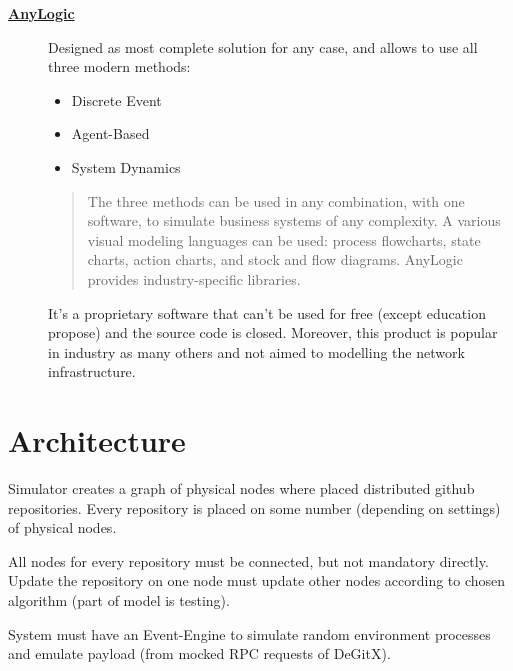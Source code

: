 \documentclass[12pt,oneside]{article}
\begin{document}
\begin{description}
  \item[\href{https://www.anylogic.com/}{\textbf{AnyLogic}}]
Designed as most complete solution for any case, and allows to use all three modern methods:
    \begin{itemize}
        \item Discrete Event
        \item Agent-Based
        \item System Dynamics
    \end{itemize}
    \begin{quote}
    The three methods can be used in any combination, with one software, to simulate business systems of any complexity. A various visual modeling languages can be used: process flowcharts, state charts, action charts, and stock and flow diagrams. AnyLogic provides industry-specific libraries.\par
    \end{quote}
It's a proprietary software that can't be used for free (except education propose) and the source code is closed. Moreover, this product is popular in industry as many others and not aimed to modelling the network infrastructure.

\end{description}

\section{Architecture}
\label{sec:arch}

Simulator creates a graph of physical nodes where placed distributed github repositories. Every repository is placed on some number (depending on settings) of physical nodes.

All nodes for every repository must be connected, but not mandatory directly. Update the repository on one node must update other nodes according to chosen algorithm (part of model is testing).

System must have an Event-Engine to simulate random environment processes and emulate payload (from mocked RPC requests of DeGitX).
\end{document}
